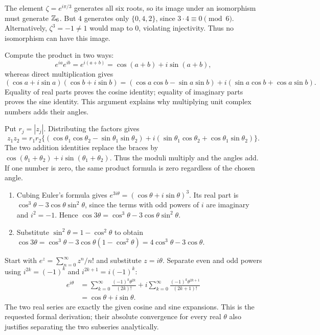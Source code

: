 
The element $\zeta=e^{i\pi/3}$ generates all six roots, so its image under an isomorphism must generate $\mathbb{Z}_6$. But $4$ generates only $\{0,4,2\}$, since $3\cdot4\equiv0\pmod6$. Alternatively, $\zeta^3=-1\ne1$ would map to $0$, violating injectivity. Thus no isomorphism can have this image.


Compute the product in two ways:
\[e^{ia}e^{ib}=e^{i(a+b)}=\cos(a+b)+i\sin(a+b),\]
whereas direct multiplication gives
\[(\cos a+i\sin a)(\cos b+i\sin b)=(\cos a\cos b-\sin a\sin b)+i(\sin a\cos b+\cos a\sin b).
\]
Equality of real parts proves the cosine identity; equality of imaginary parts proves the sine identity. This argument explains why multiplying unit complex numbers adds their angles.


Put $r_j=|z_j|$. Distributing the factors gives
\[z_1z_2=r_1r_2\{(\cos\theta_1\cos\theta_2-\sin\theta_1\sin\theta_2)+i(\sin\theta_1\cos\theta_2+\cos\theta_1\sin\theta_2)\}.
\]
The two addition identities replace the braces by $\cos(\theta_1+\theta_2)+i\sin(\theta_1+\theta_2)$. Thus the moduli multiply and the angles add. If one number is zero, the same product formula is zero regardless of the chosen angle.


\begin{enumerate}[label=(\alph*)]
\item Cubing Euler's formula gives $e^{3i\theta}=(\cos\theta+i\sin\theta)^3$. Its real part is $\cos^3\theta-3\cos\theta\sin^2\theta$, since the terms with odd powers of $i$ are imaginary and $i^2=-1$. Hence $\cos3\theta=\cos^3\theta-3\cos\theta\sin^2\theta$.
\item Substitute $\sin^2\theta=1-\cos^2\theta$ to obtain $\cos3\theta=\cos^3\theta-3\cos\theta(1-\cos^2\theta)=4\cos^3\theta-3\cos\theta$.
\end{enumerate}

Start with $e^z=\sum_{n=0}^\infty z^n/n!$ and substitute $z=i\theta$. Separate even and odd powers using $i^{2k}=(-1)^k$ and $i^{2k+1}=i(-1)^k$:
\[
\begin{aligned}
e^{i\theta}
&=\sum_{k=0}^\infty\frac{(-1)^k\theta^{2k}}{(2k)!}
+i\sum_{k=0}^\infty\frac{(-1)^k\theta^{2k+1}}{(2k+1)!}\\
&=\cos\theta+i\sin\theta.
\end{aligned}
\]
The two real series are exactly the given cosine and sine expansions. This is the requested formal derivation; their absolute convergence for every real $\theta$ also justifies separating the two subseries analytically.
